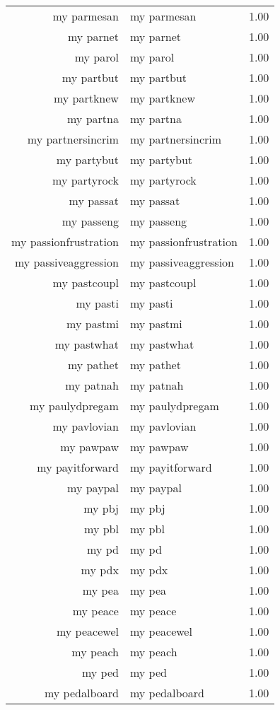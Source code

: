 \begin{table}[ht]
\begin{tabular}{rlr}
  my parmesan & my parmesan & 1.00 \\ 
  my parnet & my parnet & 1.00 \\ 
  my parol & my parol & 1.00 \\ 
  my partbut & my partbut & 1.00 \\ 
  my partknew & my partknew & 1.00 \\ 
  my partna & my partna & 1.00 \\ 
  my partnersincrim & my partnersincrim & 1.00 \\ 
  my partybut & my partybut & 1.00 \\ 
  my partyrock & my partyrock & 1.00 \\ 
  my passat & my passat & 1.00 \\ 
  my passeng & my passeng & 1.00 \\ 
  my passionfrustration & my passionfrustration & 1.00 \\ 
  my passiveaggression & my passiveaggression & 1.00 \\ 
  my pastcoupl & my pastcoupl & 1.00 \\ 
  my pasti & my pasti & 1.00 \\ 
  my pastmi & my pastmi & 1.00 \\ 
  my pastwhat & my pastwhat & 1.00 \\ 
  my pathet & my pathet & 1.00 \\ 
  my patnah & my patnah & 1.00 \\ 
  my paulydpregam & my paulydpregam & 1.00 \\ 
  my pavlovian & my pavlovian & 1.00 \\ 
  my pawpaw & my pawpaw & 1.00 \\ 
  my payitforward & my payitforward & 1.00 \\ 
  my paypal & my paypal & 1.00 \\ 
  my pbj & my pbj & 1.00 \\ 
  my pbl & my pbl & 1.00 \\ 
  my pd & my pd & 1.00 \\ 
  my pdx & my pdx & 1.00 \\ 
  my pea & my pea & 1.00 \\ 
  my peace & my peace & 1.00 \\ 
  my peacewel & my peacewel & 1.00 \\ 
  my peach & my peach & 1.00 \\ 
  my ped & my ped & 1.00 \\ 
  my pedalboard & my pedalboard & 1.00 \\ 

\end{tabular}
\end{table}
